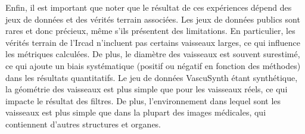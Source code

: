 Enfin, il est important que noter que le résultat de ces expériences dépend des jeux de données et des vérités terrain associées. Les jeux de données publics sont rares et donc précieux, même s'ils présentent des limitations. En particulier, les vérités terrain de l'Ircad n'incluent pas certains vaisseaux larges, ce qui influence les métriques calculées. De plus, le diamètre des vaisseaux est souvent surestimé, ce qui ajoute un biais systématique (positif ou négatif en fonction des méthodes) dans les résultats quantitatifs. Le jeu de données VascuSynth étant synthétique, la géométrie des vaisseaux est plus simple que pour les vaisseaux réels, ce qui impacte le résultat des filtres. De plus, l'environnement dans lequel sont les vaisseaux est plus simple que dans la plupart des images médicales, qui contiennent d'autres structures et organes.



